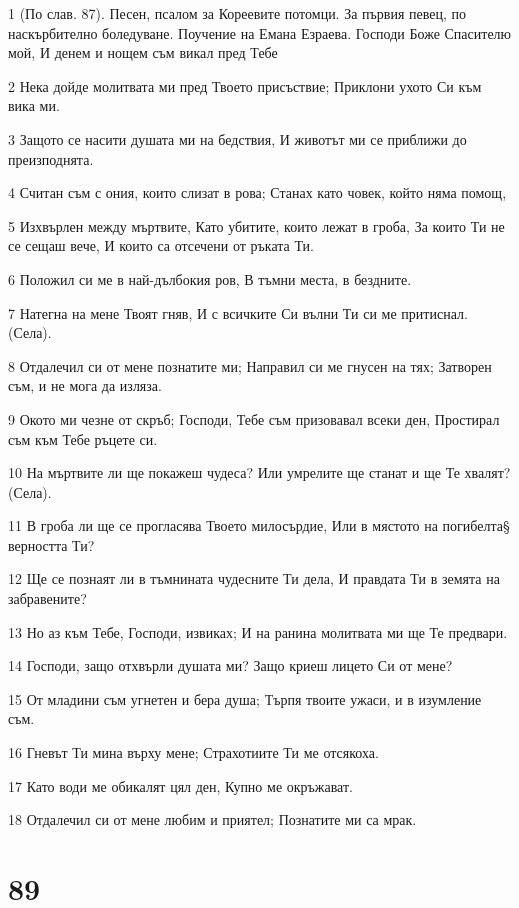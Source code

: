 \par 1 (По слав. 87). Песен, псалом за Кореевите потомци. За първия певец, по наскърбително боледуване. Поучение на Емана Езраева. Господи Боже Спасителю мой, И денем и нощем съм викал пред Тебе
\par 2 Нека дойде молитвата ми пред Твоето присъствие; Приклони ухото Си към вика ми.
\par 3 Защото се насити душата ми на бедствия, И животът ми се приближи до преизподнята.
\par 4 Считан съм с ония, които слизат в рова; Станах като човек, който няма помощ,
\par 5 Изхвърлен между мъртвите, Като убитите, които лежат в гроба, За които Ти не се сещаш вече, И които са отсечени от ръката Ти.
\par 6 Положил си ме в най-дълбокия ров, В тъмни места, в бездните.
\par 7 Натегна на мене Твоят гняв, И с всичките Си вълни Ти си ме притиснал. (Села).
\par 8 Отдалечил си от мене познатите ми; Направил си ме гнусен на тях; Затворен съм, и не мога да изляза.
\par 9 Окото ми чезне от скръб; Господи, Тебе съм призовавал всеки ден, Простирал съм към Тебе ръцете си.
\par 10 На мъртвите ли ще покажеш чудеса? Или умрелите ще станат и ще Те хвалят? (Села).
\par 11 В гроба ли ще се прогласява Твоето милосърдие, Или в мястото на погибелта§ верността Ти?
\par 12 Ще се познаят ли в тъмнината чудесните Ти дела, И правдата Ти в земята на забравените?
\par 13 Но аз към Тебе, Господи, извиках; И на ранина молитвата ми ще Те предвари.
\par 14 Господи, защо отхвърли душата ми? Защо криеш лицето Си от мене?
\par 15 От младини съм угнетен и бера душа; Търпя твоите ужаси, и в изумление съм.
\par 16 Гневът Ти мина върху мене; Страхотиите Ти ме отсякоха.
\par 17 Като води ме обикалят цял ден, Купно ме окръжават.
\par 18 Отдалечил си от мене любим и приятел; Познатите ми са мрак.

\chapter{89}

